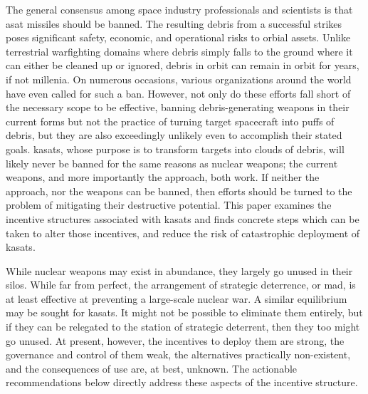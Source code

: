 
\maketitle

\pagestyle{theRest}
\thispagestyle{firstPage}



The general consensus among space industry professionals and
scientists is that \ac{asat} missiles should be banned.  The resulting
debris from a successful strikes poses significant safety, economic,
and operational risks to orbial assets.  Unlike terrestrial
warfighting domains where debris simply falls to the ground where it
can either be cleaned up or ignored, debris in orbit can remain in
orbit for years, if not millenia.  On numerous occasions, various
organizations around the world have even called for such a ban.
However, not only do these efforts fall short of the necessary scope
to be effective, banning debris-generating weapons in their current
forms but not the practice of turning target spacecraft into puffs of
debris, but they are also exceedingly unlikely even to accomplish
their stated goals.  \acp{kasat}, whose purpose is to transform
targets into clouds of debris, will likely never be banned for the
same reasons as nuclear weapons; the current weapons, and more
importantly the approach, both work.  If neither the approach, nor the
weapons can be banned, then efforts should be turned to the problem of
mitigating their destructive potential.  This paper examines the
incentive structures associated with \acp{kasat} and finds concrete
steps which can be taken to alter those incentives, and reduce the
risk of catastrophic deployment of \acp{kasat}.

While nuclear weapons may exist in abundance, they largely go unused
in their silos.  While far from perfect, the arrangement of strategic
deterrence, or \ac{mad}, is at least effective at preventing a
large-scale nuclear war.  A similar equilibrium may be sought for
\acp{kasat}.  It might not be possible to eliminate them entirely, but
if they can be relegated to the station of strategic deterrent, then
they too might go unused.  At present, however, the incentives to
deploy them are strong, the governance and control of them weak, the
alternatives practically non-existent, and the consequences of use
are, at best, unknown.  The actionable recommendations below directly
address these aspects of the incentive structure.

